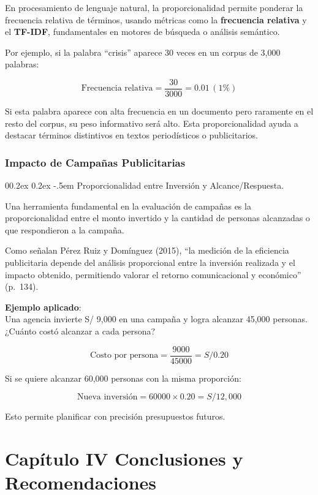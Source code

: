 \documentclass[
  stu,
  floatsintext,
  longtable,
  a4paper,
  nolmodern,
  notxfonts,
  notimes,
  colorlinks=true,linkcolor=blue,citecolor=blue,urlcolor=blue]{apa7}
\makeatletter
\renewcommand{\paragraph}{\@startsection{paragraph}{4}{\parindent}%
	{0\baselineskip \@plus 0.2ex \@minus 0.2ex}%
	{-.5em}%
	{\normalfont\normalsize\bfseries\typesectitle}}
\makeatother
\begin{document}
En procesamiento de lenguaje natural, la proporcionalidad permite
ponderar la frecuencia relativa de términos, usando métricas como la
\textbf{frecuencia relativa} y el \textbf{TF-IDF}, fundamentales en
motores de búsqueda o análisis semántico.

Por ejemplo, si la palabra ``crisis'' aparece 30 veces en un corpus de
3,000 palabras:

\[
\text{Frecuencia relativa} = \frac{30}{3000} = 0.01 \, (1\%)
\]

Si esta palabra aparece con alta frecuencia en un documento pero
raramente en el resto del corpus, su peso informativo será alto. Esta
proporcionalidad ayuda a destacar términos distintivos en textos
periodísticos o publicitarios.

\subsubsection{Impacto de Campañas
Publicitarias}\label{impacto-de-campauxf1as-publicitarias}

\paragraph{Proporcionalidad entre Inversión y
Alcance/Respuesta.}\label{proporcionalidad-entre-inversiuxf3n-y-alcancerespuesta}

Una herramienta fundamental en la evaluación de campañas es la
proporcionalidad entre el monto invertido y la cantidad de personas
alcanzadas o que respondieron a la campaña.

Como señalan Pérez Ruiz y Domínguez (2015), ``la medición de la
eficiencia publicitaria depende del análisis proporcional entre la
inversión realizada y el impacto obtenido, permitiendo valorar el
retorno comunicacional y económico'' (p.~134).

\textbf{Ejemplo aplicado}:\\
Una agencia invierte S/ 9,000 en una campaña y logra alcanzar 45,000
personas. ¿Cuánto costó alcanzar a cada persona?

\[
\text{Costo por persona} = \frac{9000}{45000} = S/ 0.20
\]

Si se quiere alcanzar 60,000 personas con la misma proporción:

\[
\text{Nueva inversión} = 60000 \times 0.20 = S/ 12,000
\]

Esto permite planificar con precisión presupuestos futuros.

\section{Capítulo IV Conclusiones y
Recomendaciones}\label{capuxedtulo-iv-conclusiones-y-recomendaciones}
\end{document}
